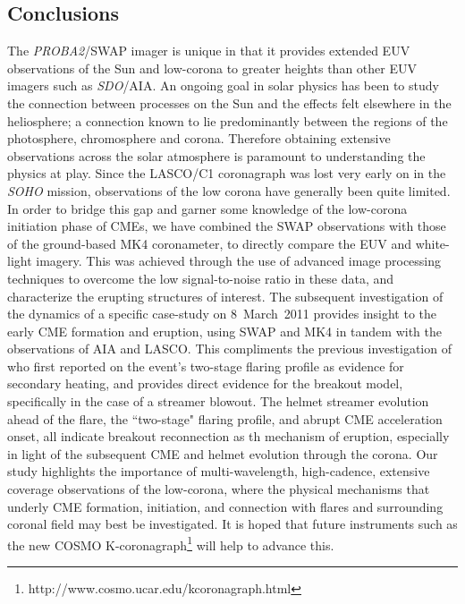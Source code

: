 \documentclass[namedreferences]{solarphysics}
\begin{document}
\begin{article}
\section{Conclusions}
\label{sect:conclusions}

The \emph{PROBA2}/SWAP imager is unique in that it provides extended EUV observations of the Sun and low-corona to greater heights than other EUV imagers such as \emph{SDO}/AIA. An ongoing goal in solar physics has been to study the connection between processes on the Sun and the effects felt elsewhere in the heliosphere; a connection known to lie predominantly between the regions of the photosphere, chromosphere and corona. Therefore obtaining extensive observations across the solar atmosphere is paramount to understanding the physics at play. Since the LASCO/C1 coronagraph was lost very early on in the \emph{SOHO} mission, observations of the low corona have generally been quite limited. In order to bridge this gap and garner some knowledge of the low-corona initiation phase of CMEs, we have combined the SWAP observations with those of the ground-based MK4 coronameter, to directly compare the EUV and white-light imagery. This was achieved through the use of advanced image processing techniques to overcome the low signal-to-noise ratio in these data, and characterize the erupting structures of interest. The subsequent investigation of the dynamics of a specific case-study on 8~March~2011 provides insight to the early CME formation and eruption, using SWAP and MK4 in tandem with the observations of AIA and LASCO. This compliments the previous investigation of  who first reported on the event's two-stage flaring profile as evidence for secondary heating, and provides direct evidence for the breakout model, specifically in the case of a streamer blowout. The helmet streamer evolution ahead of the flare, the ``two-stage" flaring profile, and abrupt CME acceleration onset, all indicate breakout reconnection as th mechanism of eruption, especially in light of the subsequent CME and helmet evolution through the corona. Our study highlights the importance of multi-wavelength, high-cadence, extensive coverage observations of the low-corona, where the physical mechanisms that underly CME formation, initiation, and connection with flares and surrounding coronal field may best be investigated. It is hoped that future instruments such as the new COSMO K-coronagraph\footnote{http://www.cosmo.ucar.edu/kcoronagraph.html} will help to advance this.






\end{article}
\end{document}
